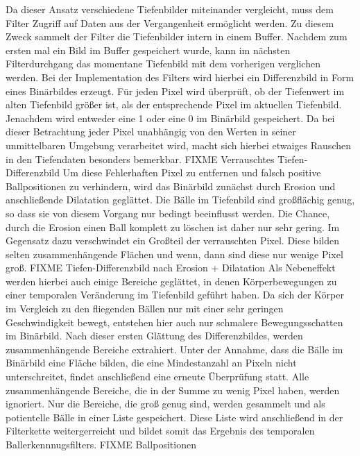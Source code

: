 \documentclass[12pt,a4paper,ngerman]{scrartcl}
\begin{document}
Da dieser Ansatz verschiedene Tiefenbilder miteinander vergleicht, muss dem Filter Zugriff auf Daten aus der Vergangenheit ermöglicht werden.
Zu diesem Zweck sammelt der Filter die Tiefenbilder intern in einem Buffer.
Nachdem zum ersten mal ein Bild im Buffer gespeichert wurde, kann im nächsten Filterdurchgang das momentane Tiefenbild mit dem vorherigen verglichen werden.
Bei der Implementation des Filters wird hierbei ein Differenzbild in Form eines Binärbildes erzeugt.
Für jeden Pixel wird überprüft, ob der Tiefenwert im alten Tiefenbild größer ist, als der entsprechende Pixel im aktuellen Tiefenbild.
Jenachdem wird entweder eine 1 oder eine 0 im Binärbild gespeichert.
Da bei dieser Betrachtung jeder Pixel unabhängig von den Werten in seiner unmittelbaren Umgebung verarbeitet wird, macht sich hierbei etwaiges Rauschen in den Tiefendaten besonders bemerkbar.
{\color{red}FIXME Verrauschtes Tiefen-Differenzbild}
Um diese Fehlerhaften Pixel zu entfernen und falsch positive Ballpositionen zu verhindern, wird das Binärbild zunächst durch Erosion und anschließende Dilatation geglättet.
Die Bälle im Tiefenbild sind großflächig genug, so dass sie von diesem Vorgang nur bedingt beeinflusst werden.
Die Chance, durch die Erosion einen Ball komplett zu löschen ist daher nur sehr gering.
Im Gegensatz dazu verschwindet ein Großteil der verrauschten Pixel.
Diese bilden selten zusammenhängende Flächen und wenn, dann sind diese nur wenige Pixel groß.
{\color{red}FIXME Tiefen-Differenzbild nach Erosion + Dilatation}
Als Nebeneffekt werden hierbei auch einige Bereiche geglättet, in denen Körperbewegungen zu einer temporalen Veränderung im Tiefenbild geführt haben. Da sich der Körper im Vergleich zu den fliegenden Bällen nur mit einer sehr geringen Geschwindigkeit bewegt, entstehen hier auch nur schmalere Bewegungsschatten im Binärbild.
Nach dieser ersten Glättung des Differenzbildes, werden zusammenhängende Bereiche extrahiert.
Unter der Annahme, dass die Bälle im Binärbild eine Fläche bilden, die eine Mindestanzahl an Pixeln nicht unterschreitet, findet anschließend eine erneute Überprüfung statt. Alle zusammenhängende Bereiche, die in der Summe zu wenig Pixel haben, werden ignoriert.
Nur die Bereiche, die groß genug sind, werden gesammelt und als potientelle Bälle in einer Liste gespeichert.
Diese Liste wird anschließend in der Filterkette weitergerreicht und bildet somit das Ergebnis des temporalen Ballerkennnugsfilters.
{\color{red}FIXME Ballpositionen}
\end{document}
